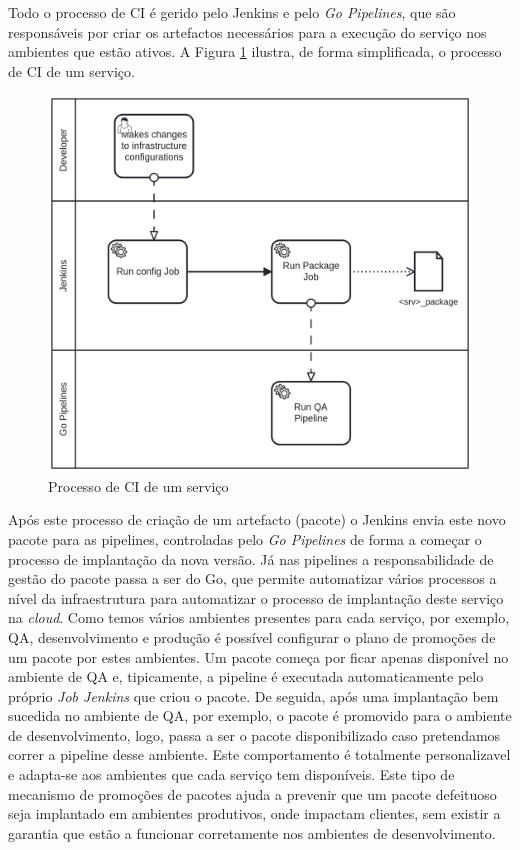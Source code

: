 Todo o processo de \ac{CI} é gerido pelo Jenkins e pelo \textit{Go Pipelines}, que são responsáveis
por criar os artefactos necessários para a execução do serviço nos ambientes que estão ativos. 
A Figura \ref{ci-process} ilustra, de forma simplificada, o processo de \ac{CI} de um serviço.

\begin{figure}[H]
  \centerline{\includegraphics[scale=0.2]{media/content/impl/ci-process.png}}
  \caption{Processo de \ac{CI} de um serviço}
  \label{ci-process}
\end{figure}

Após este processo de criação de um artefacto (pacote) o Jenkins envia este novo pacote para as
\glspl{pipeline}, controladas pelo \textit{Go Pipelines} de forma a começar o processo de 
implantação da nova versão. Já nas \glspl{pipeline} a responsabilidade de gestão do pacote passa a 
ser do Go, que permite automatizar vários processos a nível da infraestrutura para automatizar o 
processo de implantação deste serviço na \textit{cloud}. Como temos vários ambientes presentes para 
cada serviço, por exemplo, \ac{QA}, desenvolvimento e produção é possível configurar o plano de 
promoções de um pacote por estes ambientes. Um pacote começa por ficar apenas disponível no 
ambiente de QA e, tipicamente, a \gls{pipeline} é executada automaticamente pelo próprio 
\textit{Job Jenkins} que criou o pacote. De seguida, após uma implantação bem sucedida no ambiente 
de QA, por exemplo, o pacote é promovido para o ambiente de desenvolvimento, logo, passa a ser 
o pacote disponibilizado caso pretendamos correr a \gls{pipeline} desse ambiente. Este comportamento 
é totalmente personalizavel e adapta-se aos ambientes que cada serviço tem disponíveis. Este tipo 
de mecanismo de promoções de pacotes ajuda a prevenir que um pacote defeituoso seja implantado em 
ambientes produtivos, onde impactam clientes, sem existir a garantia que estão a funcionar 
corretamente nos ambientes de desenvolvimento.

